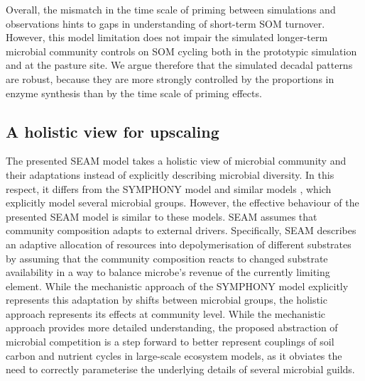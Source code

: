 Overall, the mismatch in the time scale of priming between simulations and
observations hints to gaps in understanding of short-term SOM turnover. 
However, this model limitation does not impair the
simulated longer-term microbial community controls on SOM cycling both in the
prototypic simulation and at the pasture site. We argue therefore that the
simulated decadal patterns are robust, because they are more strongly
controlled by the proportions in enzyme synthesis than by the time scale of
priming effects. 

\subsection{A holistic view for upscaling}
\label{sec:Holistic}

The presented SEAM model takes a holistic view \citep{Panikov10} of microbial
community and their adaptations instead of explicitly describing microbial
diversity.
In this respect, it differs from the SYMPHONY model \citep{Perveen14} and
similar models \citep{Fontaine03}, which explicitly model several microbial
groups.
However, the effective behaviour of the presented SEAM model is similar to these
models.
SEAM assumes that community composition adapts to external drivers.
Specifically, SEAM describes an adaptive allocation of resources into
depolymerisation of different substrates by assuming that the community
composition reacts to changed substrate availability in a way to balance
microbe's revenue of the currently limiting element.
While the mechanistic approach of the SYMPHONY model explicitly represents this
adaptation by shifts between microbial groups, the holistic approach represents
its effects at community level. While the mechanistic approach provides more
detailed understanding, the proposed abstraction of microbial competition is a
step forward to better represent couplings of soil carbon and nutrient cycles in
large-scale ecosystem models, as it obviates the need to correctly parameterise
the underlying details of several microbial guilds.

